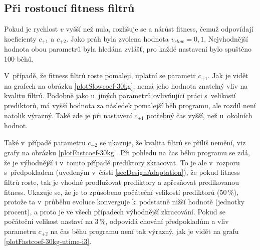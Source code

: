 \subsection*{Při rostoucí fitness filtrů}

Pokud je rychlost $v$ vyšší než nula, rozlišuje se  a  nárůst fitness, čemuž odpovídají koeficienty $c_{+1}$ a $c_{+2}$. Jako práh byla zvolena hodnota $v_\mathit{slow} = 0,1$. Nejvhodnější hodnota obou parametrů byla hledána zvlášť, pro každé nastavení bylo spuštěno 100 běhů.

V~případě, že fitness filtrů roste pomaleji, uplatní se parametr $c_{+1}$. Jak je vidět na grafech na obrázku \ref{plotSlowcoef-30kg}, nemá jeho hodnota znatelný vliv na kvalitu filtrů. Podobně jako u~jiných parametrů ovlivňující práci s~velikostí prediktorů, má vyšší hodnota za následek pomalejší běh programu, ale rozdíl není natolik výrazný. Také zde je při nastavení $c_{+1}$ potřebný čas vyšší, než u~okolních hodnot.

Také v~případě parametru $c_{+2}$ se ukazuje, že kvalita filtrů se příliš nemění, viz grafy na obrázku \ref{plotFastcoef-30kg}. Při pohledu na čas běhu programu se zdá, že je výhodnější i v~tomto případě prediktory zkracovat. To je ale v~rozporu s~předpokladem (uvedeným v~části \ref{secDesignAdaptation}), že pokud fitness filtrů roste, tak je vhodné prodlužovat prediktory a zpřesňovat predikovanou fitness. Ukazuje se, že je to způsobeno počáteční velikostí prediktorů (50\,\%), protože ta v~průběhu evoluce konverguje k~podstatně nižší hodnotě (jednotky procent), a proto je ve všech případech výhodnější zkracování. Pokud se počáteční velikost nastaví na 3\,\%, odpovídá chování předpokladům a vliv parametru $c_{+2}$ na čas běhu programu není tak výrazný, jak je vidět na grafu \ref{plotFastcoef-30kg-utime-i3}.

